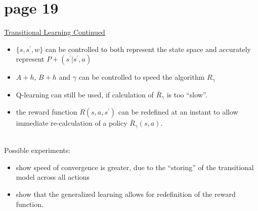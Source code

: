 \section*{page 19}

\underline{Transitional Learning Continued}\\

\renewcommand{\labelitemi}{--}
\begin{itemize}
\item $\{s,s^\prime,w\}$ can be controlled to both represent the state space and accurately represent $P+(s^\prime|s^\prime,a)$\\
\item $A+h$, $B+h$ and $\gamma$ can be controlled to speed the algorithm $R_\gamma$\\
\item Q-learning can still be used, if calculation of $\bar{R}_\gamma$ is too ``slow''.\\
\item the reward function $R(s,a,s^\prime)$ can be redefined at an instant to allow immediate re-calculation of a policy $\bar{R}_\gamma(s,a)$.
\end{itemize}
{\ }\\
Possible experiments:\begin{minipage}[t]{\linegoal}
\begin{itemize}
\item show speed of convergence is greater, due to the ``storing'' of the transitional model across all actions\\
\item show that the generalized learning allows for redefinition of the reward function.
\end{itemize}
\end{minipage} 
\renewcommand{\labelitemi}{$\bullet$}